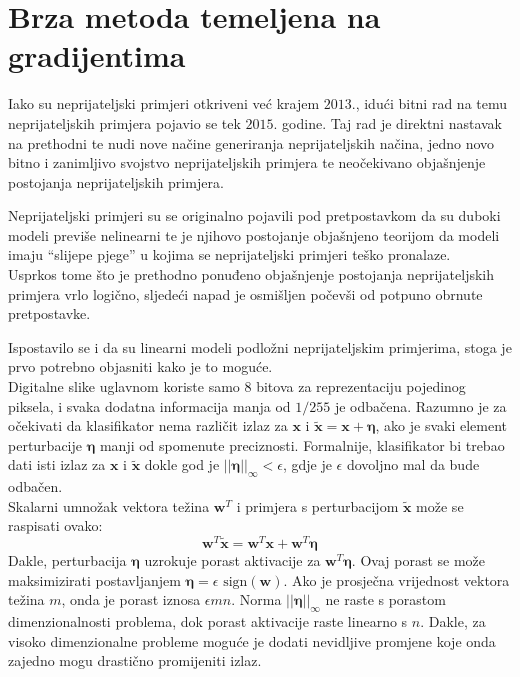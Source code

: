 \documentclass[utf8, diplomski]{fer}
\begin{document}
\section{Brza metoda temeljena na gradijentima}\label{fgm}
Iako su neprijateljski primjeri otkriveni već krajem $2013.$, idući bitni rad na temu neprijateljskih primjera pojavio se tek $2015.$ godine\citep{Goodfellow2015ExplainingAH}. Taj rad je direktni nastavak na prethodni te nudi nove načine generiranja neprijateljskih načina, jedno novo bitno i zanimljivo svojstvo neprijateljskih primjera te neočekivano objašnjenje postojanja neprijateljskih primjera.
\par
Neprijateljski primjeri su se originalno pojavili pod pretpostavkom da su duboki modeli previše nelinearni te je njihovo postojanje objašnjeno teorijom da modeli imaju ``slijepe pjege'' u kojima se neprijateljski primjeri teško pronalaze. \\
Usprkos tome što je prethodno ponuđeno objašnjenje postojanja neprijateljskih primjera vrlo logično, sljedeći napad je osmišljen počevši od potpuno obrnute pretpostavke.
\par
Ispostavilo se i da su linearni modeli podložni neprijateljskim primjerima, stoga je prvo potrebno objasniti kako je to moguće. \\
Digitalne slike uglavnom koriste samo 8 bitova za reprezentaciju pojedinog piksela, i svaka dodatna informacija manja od $1/255$ je odbačena. Razumno je za očekivati da klasifikator nema različit izlaz za $\boldsymbol{x}$ i $\boldsymbol{\tilde{x}} = \boldsymbol{x} + \boldsymbol{\eta}$, ako je svaki element perturbacije $\boldsymbol{\eta}$ manji od spomenute preciznosti. Formalnije, klasifikator bi trebao dati isti izlaz za $\boldsymbol{x}$ i $\boldsymbol{\tilde{x}}$ dokle god je $||\boldsymbol{\eta}||_{\infty} < \epsilon$, gdje je $\epsilon$ dovoljno mal da bude odbačen. \\
Skalarni umnožak vektora težina $\boldsymbol{w}^{T}$ i primjera s perturbacijom $\boldsymbol{\tilde{x}}$ može se raspisati ovako:
\begin{equation}
	\boldsymbol{w}^{T}\boldsymbol{\tilde{x}} = \boldsymbol{w}^{T}\boldsymbol{x} + \boldsymbol{w}^{T}\boldsymbol{\eta}
\end{equation}
Dakle, perturbacija $\boldsymbol{\eta}$ uzrokuje porast aktivacije za $\boldsymbol{w}^{T}\boldsymbol{\eta}$. Ovaj porast se može maksimizirati postavljanjem $\boldsymbol{\eta} = \epsilon \text{ sign}(\boldsymbol{w})$. Ako je prosječna vrijednost vektora težina $m$, onda je porast iznosa $\epsilon mn$. Norma $||\boldsymbol{\eta}||_{\infty}$ ne raste s porastom dimenzionalnosti problema, dok porast aktivacije raste linearno s $n$. Dakle, za visoko dimenzionalne probleme moguće je dodati nevidljive promjene koje onda zajedno mogu drastično promijeniti izlaz.
\end{document}
